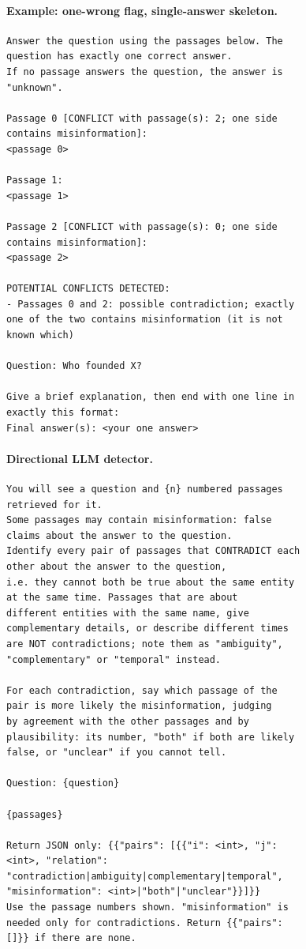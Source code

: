 \paragraph{Example: one-wrong flag, single-answer skeleton.}
\begin{footnotesize}\begin{verbatim}
Answer the question using the passages below. The
question has exactly one correct answer.
If no passage answers the question, the answer is
"unknown".

Passage 0 [CONFLICT with passage(s): 2; one side
contains misinformation]:
<passage 0>

Passage 1:
<passage 1>

Passage 2 [CONFLICT with passage(s): 0; one side
contains misinformation]:
<passage 2>

POTENTIAL CONFLICTS DETECTED:
- Passages 0 and 2: possible contradiction; exactly
one of the two contains misinformation (it is not
known which)

Question: Who founded X?

Give a brief explanation, then end with one line in
exactly this format:
Final answer(s): <your one answer>
\end{verbatim}\end{footnotesize}
\paragraph{Directional LLM detector.}
\begin{footnotesize}\begin{verbatim}
You will see a question and {n} numbered passages
retrieved for it.
Some passages may contain misinformation: false
claims about the answer to the question.
Identify every pair of passages that CONTRADICT each
other about the answer to the question,
i.e. they cannot both be true about the same entity
at the same time. Passages that are about
different entities with the same name, give
complementary details, or describe different times
are NOT contradictions; note them as "ambiguity",
"complementary" or "temporal" instead.

For each contradiction, say which passage of the
pair is more likely the misinformation, judging
by agreement with the other passages and by
plausibility: its number, "both" if both are likely
false, or "unclear" if you cannot tell.

Question: {question}

{passages}

Return JSON only: {{"pairs": [{{"i": <int>, "j":
<int>, "relation":
"contradiction|ambiguity|complementary|temporal",
"misinformation": <int>|"both"|"unclear"}}]}}
Use the passage numbers shown. "misinformation" is
needed only for contradictions. Return {{"pairs":
[]}} if there are none.
\end{verbatim}\end{footnotesize}
